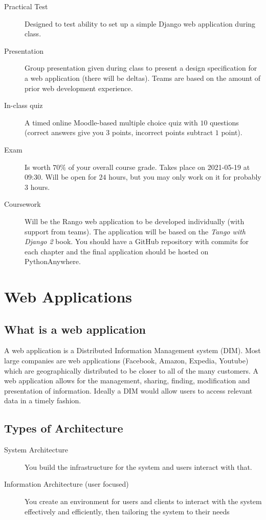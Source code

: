 \begin{description}
	\item[Practical Test] Designed to test ability to set up a simple Django web application during class.
	\item[Presentation] Group presentation given during class to present a design specification for a web application (there will be deltas). Teams are based on the amount of prior web development experience.
	\item[In-class quiz] A timed online Moodle-based multiple choice quiz with \(10\) questions (correct answers give you \(3\) points, incorrect points subtract \(1\) point).
	\item[Exam] Is worth \(70\%\) of your overall course grade. Takes place on 2021-05-19 at 09:30. Will be open for \(24\) hours, but you may only work on it for probably \(3\) hours.
	\item[Coursework] Will be the Rango web application to be developed individually (with support from teams).
	      The application will be based on the \emph{Tango with Django 2} book.
	      You should have a GitHub repository with commits for each chapter and the final application should be hosted on PythonAnywhere.
\end{description}

\section{Web Applications}\label{sec:web_applications}

\subsection{What is a web application}\label{sub:what_is_a_web_app}

A web application is a Distributed Information Management system (DIM).
Most large companies are web applications (Facebook, Amazon, Expedia, Youtube) which are geographically distributed to be closer to all of the many customers.
A web application allows for the management, sharing, finding, modification and presentation of information.
Ideally a DIM would allow users to access relevant data in a timely fashion.

\subsection{Types of Architecture}\label{sub:types_of_architecture}

\begin{description}
	\item[System Architecture] You build the infrastructure for the system and users interact with that.
	\item[Information Architecture (user focused)] You create an environment for users and clients to interact with the system effectively and efficiently, then tailoring the system to their needs
\end{description}

